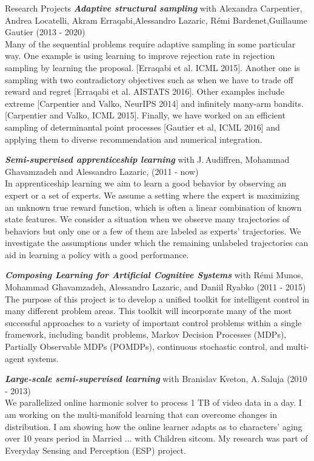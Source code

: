 \documentclass{resume}
\begin{document}
\begin{category}{Research Projects}
\citembullet \emph{\bf Adaptive structural sampling} with Alexandra Carpentier, Andrea Locatelli, Akram Erraqabi,Alessandro Lazaric, R\' emi Bardenet,Guillaume Gautier
 (2013 - 2020)\\
Many of the sequential problems require adaptive sampling in some particular way.  One example is using learning to improve rejection rate in rejection sampling by learning the proposal. [Erraqabi et al. ICML 2015]. Another one is sampling with two contradictory objectives such as when we have to trade off reward and regret [Erraqabi et al. AISTATS 2016]. Other examples include extreme [Carpentier and Valko, NeurIPS 2014] and infinitely many-arm bandits. [Carpentier and Valko, ICML 2015]. Finally, we have worked on an efficient sampling of determinantal point processes [Gautier et al, ICML 2016] and applying them to diverse recommendation  and numerical integration.


\citembullet \emph{\bf Semi-supervised apprenticeship learning} with J.\,Audiffren, Mohammad
Ghavamzadeh and Alessandro Lazaric, (2011 - now)\\
In apprenticeship learning we aim to learn a good behavior by observing an
expert or a set of experts. We assume a setting where the expert is maximizing
an unknown true reward function, which is often a linear combination of known
state features. We consider a situation when we observe many trajectories of
behaviors but only one or a few of them are labeled as experts' trajectories. We
investigate the assumptions under which the remaining unlabeled trajectories can
aid in learning a policy with a good performance.


\citembullet \emph{\bf Composing Learning for Artificial Cognitive Systems} with
R\'emi Munos,\\
Mohammad Ghavamzadeh, Alessandro Lazaric, and Daniil Ryabko
 (2011 - 2015) \\
The purpose of this project is to develop a unified toolkit for intelligent
control in many different problem areas. This toolkit will incorporate many of
the most successful approaches to a variety of important control problems within
a single framework, including bandit problems, Markov Decision Processes (MDPs),
Partially Observable MDPs (POMDPs), continuous stochastic control, and
multi-agent systems.



\citembullet \emph{\bf Large-scale semi-supervised learning} with Branislav Kveton, A.\,Saluja
(2010 -  2013) \\
	We parallelized online harmonic solver to process 1 TB of video data in a
day. 	I am working on the multi-manifold learning that can overcome changes in
distribution.
	I am showing how the online learner adapts as to  characters' aging over
10 years period in Married ... with Children sitcom.
 	My research was part of Everyday Sensing and Perception (ESP) project.




\end{category}
\end{document}
